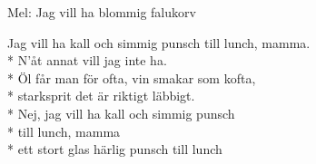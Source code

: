 \begin{SongText}
    \begin{SongInfo}
        Mel: Jag vill ha blommig falukorv
    \end{SongInfo}
    \begin{SongVerse}
        Jag vill ha kall och simmig punsch till lunch, mamma.\\*%
        N'åt annat vill jag inte ha.\\*%
        Öl får man för ofta, vin smakar som kofta,\\*%
        starksprit det är riktigt läbbigt.\\*%
        Nej, jag vill ha kall och simmig punsch\\*%
        till lunch, mamma\\*%
        ett stort glas härlig punsch till lunch
    \end{SongVerse}
\end{SongText}